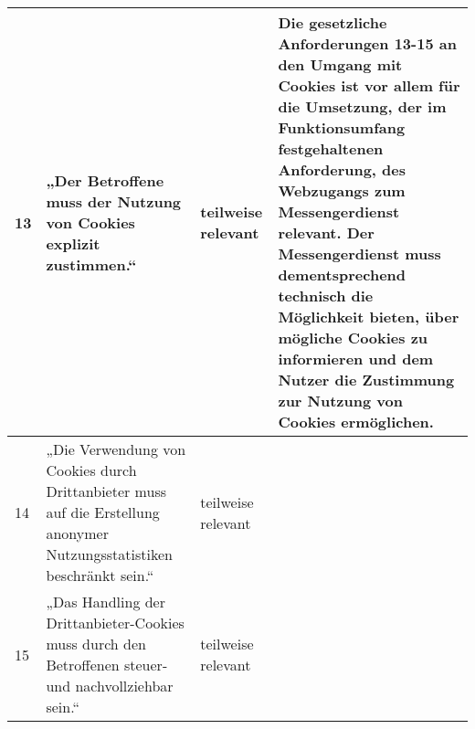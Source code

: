 \begin{longtable}{p{0.6cm}|p{6cm}|p{2cm}|p{6cm}}
    13     & „Der Betroffene muss der Nutzung von Cookies explizit zustimmen.“                                                                                                                                                                                                                                    & teilweise relevant & Die gesetzliche Anforderungen 13-15 an den Umgang mit Cookies ist vor allem für die Umsetzung, der im Funktionsumfang festgehaltenen Anforderung, des Webzugangs zum Messengerdienst relevant. Der Messengerdienst muss dementsprechend technisch die Möglichkeit bieten, über mögliche Cookies zu informieren und dem Nutzer die Zustimmung zur Nutzung von Cookies ermöglichen.                                                                                                                                                                                    \\ \hline
    14     & „Die Verwendung von Cookies durch Drittanbieter muss auf die Erstellung anonymer Nutzungsstatistiken beschränkt sein.“                                                                                                                                                                               & teilweise relevant &                                                                                                                                                                                                                                                                                                                                                                                                                                                                                                                                                                     \\ \hline
    15     & „Das Handling der Drittanbieter-Cookies muss durch den Betroffenen steuer- und nachvollziehbar sein.“                                                                                                                                                                                                & teilweise relevant &                                                                                                                                                                                                                                                                                                                                                                                                                                                                                                                                                                     \\ \hline

\end{longtable}
